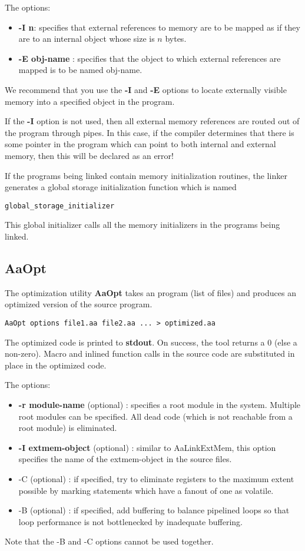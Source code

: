 The options:
\begin{itemize}
\item {\bf -I n}: specifies that external references to memory
are to be mapped as if they are to an internal object whose size
is $n$ bytes.
\item {\bf -E obj-name} : specifies that the object to which
external references are mapped is to be named obj-name.
\end{itemize}
We recommend that you use the {\bf -I} and {\bf -E} options to
locate externally visible memory into a specified object in the
\Aa program.   

If the {\bf -I} option is not used, then all external memory
references are routed out of the \Aa program through pipes.
In this case, if the \Aa compiler determines that there is some pointer 
in the program which can point
to both internal and external memory, then this will be
declared as an error!  

If the programs being linked contain memory initialization
routines, the linker generates a global storage initialization
function which is named 
\begin{verbatim}
global_storage_initializer
\end{verbatim}
This global initializer calls all the memory initializers in
the programs being linked.

\subsection{{\bf AaOpt}}

The optimization utility {\bf AaOpt} takes an \Aa program (list of
\Aa files) and produces an optimized version of the source program.
\begin{verbatim}
AaOpt options file1.aa file2.aa ... > optimized.aa
\end{verbatim}
The optimized \Aa code is printed to {\bf stdout}.  On success, 
the tool returns a 0 (else a non-zero).  Macro and inlined
function calls in the source code are substituted in place
in the optimized code.

The options:
\begin{itemize}
\item {\bf -r module-name} (optional) : specifies a root module in the
system.  Multiple root modules can be specified.  All dead code (which
is not reachable from a root module) is eliminated.
\item {\bf -I extmem-object} (optional) : similar to AaLinkExtMem,
this option specifies the name of the extmem-object in the
source \Aa files.
\item {-C} (optional) : if specified, try to eliminate registers
to the maximum extent possible by marking statements which 
have a fanout of one as volatile.
\item {-B} (optional) : if specified, add buffering to balance pipelined
loops so that loop performance is not bottlenecked by inadequate
buffering. 
\end{itemize}
Note that the -B and -C options cannot be used together.  


